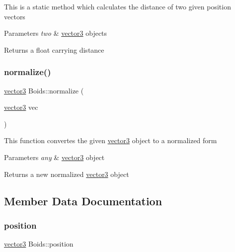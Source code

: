 This is a static method which calculates the distance of two given position vectors 
\begin{DoxyParams}{Parameters}
{\em two} & \mbox{\hyperlink{structvector3}{vector3}} objects \\
\hline
\end{DoxyParams}
\begin{DoxyReturn}{Returns}
a float carrying distance 
\end{DoxyReturn}
\mbox{\label{class_boids_a97ba17ef16828cb7924b07fe05ce271f}} 
\subsubsection{\texorpdfstring{normalize()}{normalize()}}
{\footnotesize\ttfamily \mbox{\hyperlink{structvector3}{vector3}} Boids\+::normalize (\begin{DoxyParamCaption}\item[{\mbox{\hyperlink{structvector3}{vector3}}}]{vec }\end{DoxyParamCaption})\hspace{0.3cm}{\ttfamily [static]}}

This function convertes the given \mbox{\hyperlink{structvector3}{vector3}} object to a normalized form 
\begin{DoxyParams}{Parameters}
{\em any} & \mbox{\hyperlink{structvector3}{vector3}} object \\
\hline
\end{DoxyParams}
\begin{DoxyReturn}{Returns}
a new normalized \mbox{\hyperlink{structvector3}{vector3}} object 
\end{DoxyReturn}


\subsection{Member Data Documentation}
\mbox{\label{class_boids_a621fe5fcdebb76ebdb8df6286310c1c1}} 
\subsubsection{\texorpdfstring{position}{position}}
{\footnotesize\ttfamily \mbox{\hyperlink{structvector3}{vector3}} Boids\+::position}

